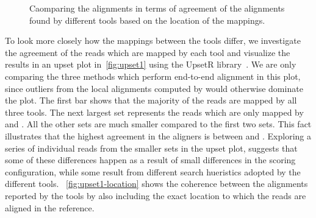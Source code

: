 \begin{figure}
    \centering
    \caption[Upset plots for comparing the alignments - location agreement]
    {Caomparing the alignments in terms of 
    agreement of the alignments found by different tools based on the location of the mappings.}
    \label{fig:upset1-location}
    \label{upsetplots}
\end{figure}

To look more closely how the mappings between the tools differ, we investigate the agreement of the reads 
which are mapped by each tool and visualize the results in an upset plot in~\cref{fig:upset1} using the 
UpsetR library~\citep{conway2017upsetr}.  We are only comparing the three methods which perform end-to-end 
alignment in this plot, since outliers from the local alignments computed by \debga would otherwise dominate 
the plot. The first bar shows that the majority of the reads are mapped by all three tools.
The next largest set represents the reads which are only mapped by \bt and \puffaligner. All the other sets 
are much smaller compared to the first two sets. This fact illustrates that the highest agreement in the 
aligners is between \bt and \puffaligner. Exploring a series of individual reads from the smaller sets in 
the upset plot, suggests that some of these differences happen as a result of small differences in the scoring 
configuration, while some result from different search hueristics adopted by the different tools.
~\cref{fig:upset1-location} shows the coherence between the alignments reported by the tools by also including 
the exact location to which the reads are aligned in the reference.



